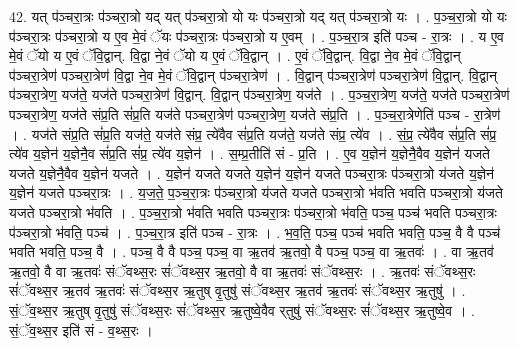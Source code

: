 \documentclass[17pt]{extarticle}
\begin{document}
42. यत् प॑ञ्चरा॒त्रः प॑ञ्चरा॒त्रो यद् यत् प॑ञ्चरा॒त्रो यो यः प॑ञ्चरा॒त्रो यद् यत् प॑ञ्चरा॒त्रो यः । . प॒ञ्च॒रा॒त्रो यो यः प॑ञ्चरा॒त्रः प॑ञ्चरा॒त्रो य ए॒व मे॒वं ॅयः प॑ञ्चरा॒त्रः प॑ञ्चरा॒त्रो य ए॒वम् । . प॒ञ्च॒रा॒त्र इति॑ पञ्च - रा॒त्रः । . य ए॒व मे॒वं ॅयो य ए॒वं ॅवि॒द्वान्. वि॒द्वा ने॒वं ॅयो य ए॒वं ॅवि॒द्वान् । . ए॒वं ॅवि॒द्वान्. वि॒द्वा ने॒व मे॒वं ॅवि॒द्वान् प॑ञ्चरा॒त्रेण॑ पञ्चरा॒त्रेण॑ वि॒द्वा ने॒व मे॒वं ॅवि॒द्वान् प॑ञ्चरा॒त्रेण॑ । . वि॒द्वान् प॑ञ्चरा॒त्रेण॑ पञ्चरा॒त्रेण॑ वि॒द्वान्. वि॒द्वान् प॑ञ्चरा॒त्रेण॒ यज॑ते॒ यज॑ते पञ्चरा॒त्रेण॑ वि॒द्वान्. वि॒द्वान् प॑ञ्चरा॒त्रेण॒ यज॑ते । . प॒ञ्च॒रा॒त्रेण॒ यज॑ते॒ यज॑ते पञ्चरा॒त्रेण॑ पञ्चरा॒त्रेण॒ यज॑ते संप्र॒ति सं॑प्र॒ति यज॑ते पञ्चरा॒त्रेण॑ पञ्चरा॒त्रेण॒ यज॑ते संप्र॒ति । . प॒ञ्च॒रा॒त्रेणेति॑ पञ्च - रा॒त्रेण॑ । . यज॑ते संप्र॒ति सं॑प्र॒ति यज॑ते॒ यज॑ते संप्र॒ त्ये॑वैव सं॑प्र॒ति यज॑ते॒ यज॑ते संप्र॒ त्ये॑व । . सं॒प्र॒ त्ये॑वैव सं॑प्र॒ति सं॑प्र॒ त्ये॑व य॒ज्ञेन॑ य॒ज्ञेनै॒व सं॑प्र॒ति सं॑प्र॒ त्ये॑व य॒ज्ञेन॑ । . स॒म्प्र॒तीति॑ सं - प्र॒ति । . ए॒व य॒ज्ञेन॑ य॒ज्ञेनै॒वैव य॒ज्ञेन॑ यजते यजते य॒ज्ञेनै॒वैव य॒ज्ञेन॑ यजते । . य॒ज्ञेन॑ यजते यजते य॒ज्ञेन॑ य॒ज्ञेन॑ यजते पञ्चरा॒त्रः प॑ञ्चरा॒त्रो य॑जते य॒ज्ञेन॑ य॒ज्ञेन॑ यजते पञ्चरा॒त्रः । . य॒ज॒ते॒ प॒ञ्च॒रा॒त्रः प॑ञ्चरा॒त्रो य॑जते यजते पञ्चरा॒त्रो भ॑वति भवति पञ्चरा॒त्रो य॑जते यजते पञ्चरा॒त्रो भ॑वति । . प॒ञ्च॒रा॒त्रो भ॑वति भवति पञ्चरा॒त्रः प॑ञ्चरा॒त्रो भ॑वति॒ पञ्च॒ पञ्च॑ भवति पञ्चरा॒त्रः प॑ञ्चरा॒त्रो भ॑वति॒ पञ्च॑ । . प॒ञ्च॒रा॒त्र इति॑ पञ्च - रा॒त्रः । . भ॒व॒ति॒ पञ्च॒ पञ्च॑ भवति भवति॒ पञ्च॒ वै वै पञ्च॑ भवति भवति॒ पञ्च॒ वै । . पञ्च॒ वै वै पञ्च॒ पञ्च॒ वा ऋ॒तव॑ ऋ॒तवो॒ वै पञ्च॒ पञ्च॒ वा ऋ॒तवः॑ । . वा ऋ॒तव॑ ऋ॒तवो॒ वै वा ऋ॒तवः॑ संॅवथ्स॒रः सं॑ॅवथ्स॒र ऋ॒तवो॒ वै वा ऋ॒तवः॑ संॅवथ्स॒रः । . ऋ॒तवः॑ संॅवथ्स॒रः सं॑ॅवथ्स॒र ऋ॒तव॑ ऋ॒तवः॑ संॅवथ्स॒र ऋ॒तुष् वृ॒तुषु॑ संॅवथ्स॒र ऋ॒तव॑ ऋ॒तवः॑ संॅवथ्स॒र ऋ॒तुषु॑ । . सं॒ॅव॒थ्स॒र ऋ॒तुष् वृ॒तुषु॑ संॅवथ्स॒रः सं॑ॅवथ्स॒र ऋ॒तुष्वे॒वैव र्‌तुषु॑ संॅवथ्स॒रः सं॑ॅवथ्स॒र ऋ॒तुष्वे॒व । . सं॒ॅव॒थ्स॒र इति॑ सं - व॒थ्स॒रः । \newline
\pagebreak
{}
\end{document}
